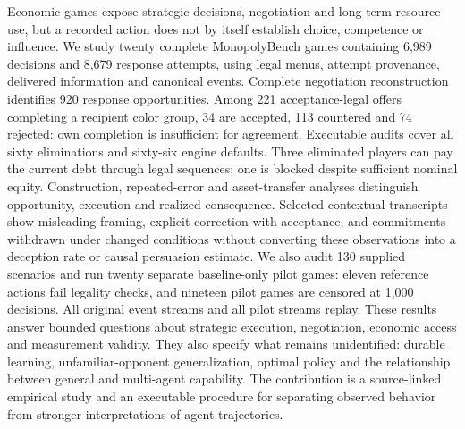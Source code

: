 Economic games expose strategic decisions, negotiation and long-term resource use, but a recorded action does not by itself establish choice, competence or influence. We study twenty complete MonopolyBench games containing 6,989 decisions and 8,679 response attempts, using legal menus, attempt provenance, delivered information and canonical events. Complete negotiation reconstruction identifies 920 response opportunities. Among 221 acceptance-legal offers completing a recipient color group, 34 are accepted, 113 countered and 74 rejected: own completion is insufficient for agreement. Executable audits cover all sixty eliminations and sixty-six engine defaults. Three eliminated players can pay the current debt through legal sequences; one is blocked despite sufficient nominal equity. Construction, repeated-error and asset-transfer analyses distinguish opportunity, execution and realized consequence. Selected contextual transcripts show misleading framing, explicit correction with acceptance, and commitments withdrawn under changed conditions without converting these observations into a deception rate or causal persuasion estimate. We also audit 130 supplied scenarios and run twenty separate baseline-only pilot games: eleven reference actions fail legality checks, and nineteen pilot games are censored at 1,000 decisions. All original event streams and all pilot streams replay. These results answer bounded questions about strategic execution, negotiation, economic access and measurement validity. They also specify what remains unidentified: durable learning, unfamiliar-opponent generalization, optimal policy and the relationship between general and multi-agent capability. The contribution is a source-linked empirical study and an executable procedure for separating observed behavior from stronger interpretations of agent trajectories.
